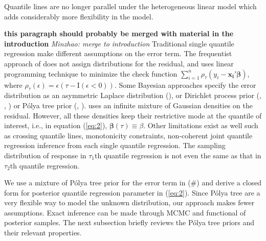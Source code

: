 \documentclass[12pt]{article}
\newcommand{\polya}{P\'{o}lya}
\begin{document}

Quantile lines
are no longer parallel
under the heterogeneous linear model which adds considerably more
flexibility in the model.

{\bf this paragraph should probably be merged with material in the
  introduction}
{\it Minzhao: merge to introduction}
Traditional single quantile regression make different assumptions on
the error term. The frequentist approach of \citep{koenker1978} does not
assign distributions for the residual, and uses linear
programming technique to minimize the check function $\sum_{i=1}^n
\rho_{\tau}(y_i - \bm{x_i'\beta})$, where $\rho_{\tau}(\epsilon) =
\epsilon (\tau- \mathrm{I}(\epsilon < 0))$.
Some Bayesian
approaches specify the error distribution as an asymmetric Laplace
distribution (\citep{yu2001}), or Dirichlet process prior
(\citep{kottas2001}, \citep{kottas2009},  \citep{taddy2010}) or
\polya{} tree prior (\citep{walker1999}, \citep{hanson2002}). \citep{reich2010}
uses an infinite mixture of Gaussian densities on the
residual. However, all these densities keep their
restrictive mode at the quantile of interest, i.e., in equation
(\ref{eq:2}), $\bm{\beta}(\tau) \equiv \beta$. Other limitations exist
as well such as crossing quantile lines, monotonicity constraints,
non-coherent joint quantile regression inference from each single
quantile regression. The sampling distribution of response in
$\tau_1$th quantile regression is not even the same as that in
$\tau_2$th quantile regression.

We use a mixture of \polya{} tree prior for the error term in (\#) and
derive a
closed form for posterior quantile regression parameter in
(\ref{eq:2}).
Since \polya{}
tree are a very flexible way to model the unknown distribution, our
approach makes fewer assumptions.
Exact
inference can be made through MCMC and functional of posterior
samples. The next subsection briefly reviews the \polya{} tree priors and
their relevant properties.
\end{document}
